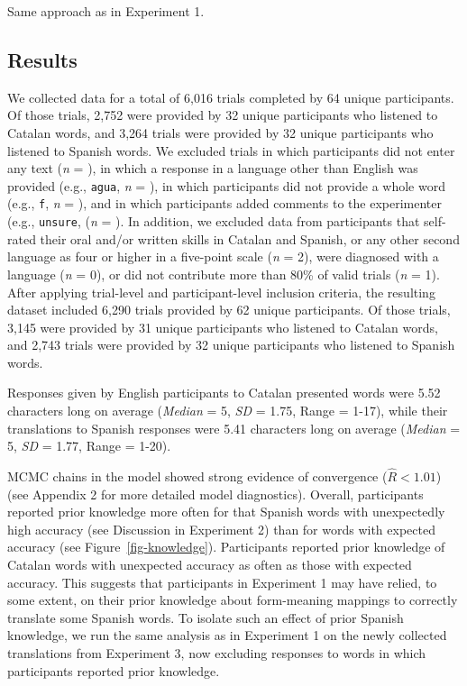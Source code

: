 \documentclass[
]{article}
\begin{document}
Same approach as in Experiment 1.

\subsection{Results}\label{results-2}

We collected data for a total of 6,016 trials completed by 64 unique
participants. Of those trials, 2,752 were provided by 32 unique
participants who listened to Catalan words, and 3,264 trials were
provided by 32 unique participants who listened to Spanish words. We
excluded trials in which participants did not enter any text (\emph{n} =
), in which a response in a language other than English was provided
(e.g., \texttt{agua}, \emph{n} = ), in which participants did not
provide a whole word (e.g., \texttt{f}, \emph{n} = ), and in which
participants added comments to the experimenter (e.g., \texttt{unsure},
(\emph{n} = ). In addition, we excluded data from participants that
self-rated their oral and/or written skills in Catalan and Spanish, or
any other second language as four or higher in a five-point scale
(\emph{n} = 2), were diagnosed with a language (\emph{n} = 0), or did
not contribute more than 80\% of valid trials (\emph{n} = 1). After
applying trial-level and participant-level inclusion criteria, the
resulting dataset included 6,290 trials provided by 62 unique
participants. Of those trials, 3,145 were provided by 31 unique
participants who listened to Catalan words, and 2,743 trials were
provided by 32 unique participants who listened to Spanish words.

Responses given by English participants to Catalan presented words were
5.52 characters long on average (\emph{Median} = 5, \emph{SD} = 1.75,
Range = 1-17), while their translations to Spanish responses were 5.41
characters long on average (\emph{Median} = 5, \emph{SD} = 1.77, Range =
1-20).

MCMC chains in the model showed strong evidence of convergence
(\(\hat{R}<1.01\)) (see Appendix 2 for more detailed model diagnostics).
Overall, participants reported prior knowledge more often for that
Spanish words with unexpectedly high accuracy (see Discussion in
Experiment 2) than for words with expected accuracy (see
Figure~\ref{fig-knowledge}). Participants reported prior knowledge of
Catalan words with unexpected accuracy as often as those with expected
accuracy. This suggests that participants in Experiment 1 may have
relied, to some extent, on their prior knowledge about form-meaning
mappings to correctly translate some Spanish words. To isolate such an
effect of prior Spanish knowledge, we run the same analysis as in
Experiment 1 on the newly collected translations from Experiment 3, now
excluding responses to words in which participants reported prior
knowledge.
\end{document}
